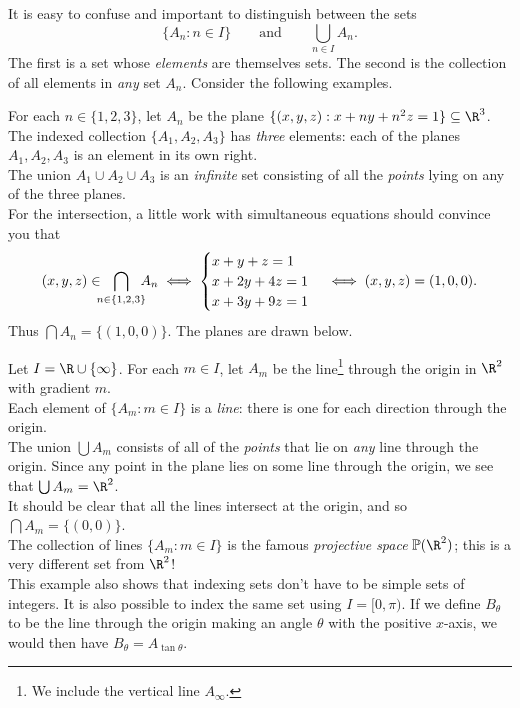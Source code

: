 It is easy to confuse and important to distinguish between the sets
\[\{A_n:n\in I\}\qquad\text{and}\qquad\bigcup_{n\in I}A_n.\]
The first is a set whose \emph{elements} are themselves sets. The second is the collection of all elements in \emph{any} set $A_n$. Consider the following examples.


\begin{examples}
	\item For each $n\in\{1,2,3\}$, let $A_n$ be the plane $\{(x,y,z):x+ny+n^2z=1\}\subseteq\R^3$.\\[2pt]
	The indexed collection $\{A_1,A_2,A_3\}$ has \emph{three} elements: each of the planes $A_1,A_2,A_3$ is an element in its own right.\\
  The union $A_1\cup A_2\cup A_3$ is an \emph{infinite} set consisting of all the \emph{points} lying on any of the three planes.\\
  For the intersection, a little work with simultaneous equations should convince you that
  \[(x,y,z)\in\negthickspace\negthickspace\bigcap_{n\in\{1,2,3\}}\negthickspace\negthickspace A_n\iff
  \begin{cases}
  x+y+z=1\\
  x+2y+4z=1\\
  x+3y+9z=1
  \end{cases}\iff (x,y,z)=(1,0,0).\]
  Thus $\bigcap A_n=\{(1,0,0)\}$. The planes are drawn below.
  
  \item\label{ex:projline} Let $I=\R\cup\{\infty\}$. For each $m\in I$, let $A_m$ be the line\footnote{We include the vertical line $A_\infty$.} through the origin in $\R^2$ with gradient $m$.\\[2pt]
  Each element of $\{A_m:m\in I\}$ is a \emph{line}: there is one for each direction through the origin.\\
  The union $\bigcup A_m$ consists of all of the \emph{points} that lie on \emph{any} line through the origin. Since any point in the plane lies on some line through the origin, we see that $\bigcup A_m=\R^2$.\\
  It should be clear that all the lines intersect at the origin, and so $\bigcap A_m=\{(0,0)\}$.\\
  The collection of lines $\{A_m:m\in I\}$ is the famous \emph{projective space} $\mathbb P(\R^2)$; this is a very different set from $\R^2$!\\
  This example also shows that indexing sets don't have to be simple sets of integers. It is also possible to index the same set using $I=[0,\pi)$. If we define $B_\theta$ to be the line through the origin making an angle $\theta$ with the positive $x$-axis, we would then have $B_\theta=A_{\tan\theta}$.
\end{examples}

